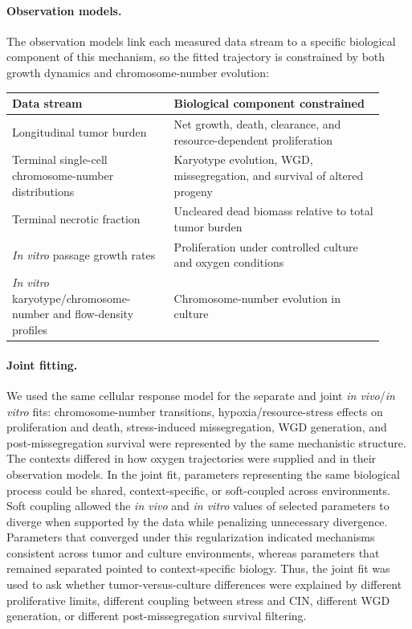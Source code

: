 \documentclass[11pt]{article}
\begin{document}
\paragraph{Observation models.}
The observation models link each measured data stream to a specific biological component of this mechanism, so the fitted trajectory is constrained by both growth dynamics and chromosome-number evolution:

\begin{center}
\begin{tabular}{p{0.40\linewidth}p{0.52\linewidth}}
\toprule
\textbf{Data stream} & \textbf{Biological component constrained} \\
\midrule
Longitudinal tumor burden & Net growth, death, clearance, and resource-dependent proliferation \\
Terminal single-cell chromosome-number distributions & Karyotype evolution, WGD, missegregation, and survival of altered progeny \\
Terminal necrotic fraction & Uncleared dead biomass relative to total tumor burden \\
\textit{In vitro} passage growth rates & Proliferation under controlled culture and oxygen conditions \\
\textit{In vitro} karyotype/chromosome-number and flow-density profiles & Chromosome-number evolution in culture \\
\bottomrule
\end{tabular}
\end{center}

\paragraph{Joint fitting.}
We used the same cellular response model for the separate and joint \textit{in vivo}/\textit{in vitro} fits: chromosome-number transitions, hypoxia/resource-stress effects on proliferation and death, stress-induced missegregation, WGD generation, and post-missegregation survival were represented by the same mechanistic structure. The contexts differed in how oxygen trajectories were supplied and in their observation models. In the joint fit, parameters representing the same biological process could be shared, context-specific, or soft-coupled across environments. Soft coupling allowed the \textit{in vivo} and \textit{in vitro} values of selected parameters to diverge when supported by the data while penalizing unnecessary divergence. Parameters that converged under this regularization indicated mechanisms consistent across tumor and culture environments, whereas parameters that remained separated pointed to context-specific biology. Thus, the joint fit was used to ask whether tumor-versus-culture differences were explained by different proliferative limits, different coupling between stress and CIN, different WGD generation, or different post-missegregation survival filtering.
\end{document}
